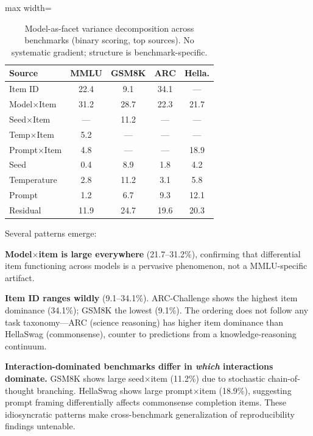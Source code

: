 \documentclass[11pt,twocolumn]{article}
\newcommand{\pct}{\%}
\begin{document}
\begin{table}[t]
\centering
\caption{Model-as-facet variance decomposition across benchmarks (binary scoring, top sources). No systematic gradient; structure is benchmark-specific.}
\label{tab:cross_benchmark}
\small
\begin{adjustbox}{max width=\columnwidth}
\begin{tabular}{@{}lcccc@{}}
\toprule
\textbf{Source} & \textbf{MMLU} & \textbf{GSM8K} & \textbf{ARC} & \textbf{Hella.} \\
\midrule
Item ID          & 22.4 &  9.1 & 34.1 &  --- \\
Model$\times$Item & 31.2 & 28.7 & 22.3 & 21.7 \\
Seed$\times$Item &  --- & 11.2 &  --- &  --- \\
Temp$\times$Item &  5.2 &  --- &  --- &  --- \\
Prompt$\times$Item & 4.8 &  --- &  --- & 18.9 \\
Seed             &  0.4 &  8.9 &  1.8 &  4.2 \\
Temperature      &  2.8 & 11.2 &  3.1 &  5.8 \\
Prompt           &  1.2 &  6.7 &  9.3 & 12.1 \\
Residual         & 11.9 & 24.7 & 19.6 & 20.3 \\
\bottomrule
\end{tabular}
\end{adjustbox}
\vspace{-2mm}
\end{table}

Several patterns emerge:

\textbf{Model$\times$item is large everywhere} (21.7--31.2\pct{}), confirming that differential item functioning across models is a pervasive phenomenon, not a MMLU-specific artifact.

\textbf{Item ID ranges wildly} (9.1--34.1\pct{}). ARC-Challenge shows the highest item dominance (34.1\pct{}); GSM8K the lowest (9.1\pct{}). The ordering does not follow any task taxonomy---ARC (science reasoning) has higher item dominance than HellaSwag (commonsense), counter to predictions from a knowledge-reasoning continuum.

\textbf{Interaction-dominated benchmarks differ in \emph{which} interactions dominate.} GSM8K shows large seed$\times$item (11.2\pct{}) due to stochastic chain-of-thought branching. HellaSwag shows large prompt$\times$item (18.9\pct{}), suggesting prompt framing differentially affects commonsense completion items. These idiosyncratic patterns make cross-benchmark generalization of reproducibility findings untenable.
\end{document}
